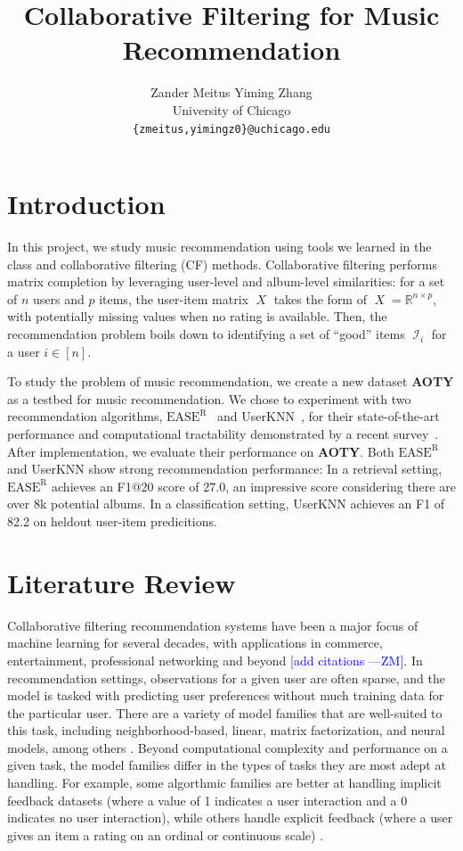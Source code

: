 \documentclass{article}
\title{Collaborative Filtering for Music Recommendation}
\author{
  Zander Meitus \qquad Yiming Zhang \\
  University of Chicago \\
  \texttt{\{zmeitus,yimingz0\}@uchicago.edu}
}
\newcommand{\aoty}{{\bf AOTY}\xspace}
\DeclareMathOperator{\X}{\mathit{X}}
\DeclareMathOperator{\I}{\mathcal{I}}
\newcommand{\easer}{$\text{EASE}^\text{R}$\xspace}
\newcommand{\userknn}{UserKNN\xspace}
\newcommand{\zander}[1]{\textcolor{blue}{[#1 ---\textsc{ZM}]}}
\begin{document}
\maketitle

\section{Introduction}

In this project, we study music recommendation using tools we learned in the
 class and collaborative filtering (CF) methods.
Collaborative filtering performs matrix completion by leveraging user-level and
 album-level similarities: for a set of $n$ users and $p$ items, the user-item
 matrix $\X$ takes the form of $\X = \mathbb{R}^{n \times p}$, with potentially
 missing values when no rating is available.
Then, the recommendation problem boils down to identifying a set of ``good''
 items $\I_i$ for a user $i \in [n]$.

To study the problem of music recommendation, we create a new dataset \aoty as
 a testbed for music recommendation.
We chose to experiment with two recommendation algorithms,
 \easer~\citep{steckEmbarrassinglyShallowAutoencoders2019} and
 \userknn~\citep{resnickGroupLensOpenArchitecture1994}, for their
 state-of-the-art performance and computational tractability demonstrated by a
 recent survey~\citep{anelliTopNRecommendationAlgorithms2022}.
After implementation, we evaluate their performance on \aoty.
Both \easer and \userknn show strong recommendation performance: In a retrieval
 setting, \easer achieves an F1@20 score of 27.0, an impressive score
 considering there are over 8k potential albums.
In a classification setting, \userknn achieves an F1 of 82.2 on heldout
 user-item predicitions.

\section{Literature Review}
Collaborative filtering recommendation systems have been a major focus of
 machine learning for several decades, with applications in commerce,
 entertainment, professional networking and beyond \zander{add citations}.
In recommendation settings, observations for a given user are often sparse, and
 the model is tasked with predicting user preferences without much training data
 for the particular user.
There are a variety of model families that are well-suited to this task,
 including neighborhood-based, linear, matrix factorization, and neural models,
 among others \citep{anelliTopNRecommendationAlgorithms2022}.
Beyond computational complexity and performance on a given task, the model
 families differ in the types of tasks they are most adept at handling.
For example, some algorthmic families are better at handling implicit feedback
 datasets (where a value of 1 indicates a user interaction and a 0 indicates no
 user interaction), while others handle explicit feedback (where a user gives an
 item a rating on an ordinal or continuous scale)
 \citep{steckEmbarrassinglyShallowAutoencoders2019}.
\end{document}
